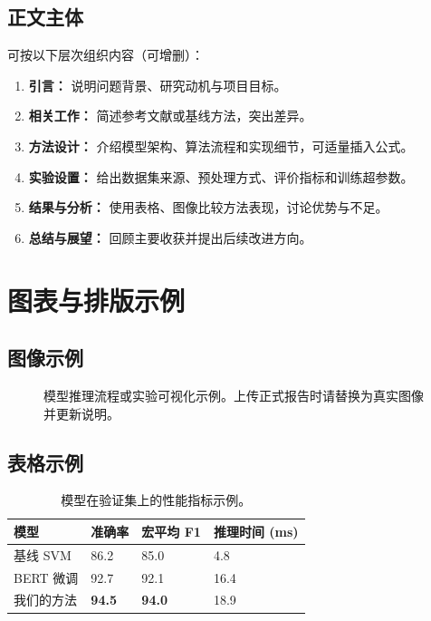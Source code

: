 \documentclass{applemlr}
\begin{document}
\subsection{正文主体}
可按以下层次组织内容（可增删）：
\begin{enumerate}
  \item \textbf{引言：} 说明问题背景、研究动机与项目目标。
  \item \textbf{相关工作：} 简述参考文献或基线方法，突出差异。
  \item \textbf{方法设计：} 介绍模型架构、算法流程和实现细节，可适量插入公式。
  \item \textbf{实验设置：} 给出数据集来源、预处理方式、评价指标和训练超参数。
  \item \textbf{结果与分析：} 使用表格、图像比较方法表现，讨论优势与不足。
  \item \textbf{总结与展望：} 回顾主要收获并提出后续改进方向。
\end{enumerate}

\section{图表与排版示例}
\label{sec:figures}

\subsection{图像示例}
\begin{figure}[ht]
  \centering
  \caption{模型推理流程或实验可视化示例。上传正式报告时请替换为真实图像并更新说明。}
  \label{fig:placeholder}
\end{figure}

\subsection{表格示例}
\begin{table}[ht]
  \centering
  \caption{模型在验证集上的性能指标示例。}
  \label{tab:metrics}
  \begin{tabularx}{0.9\linewidth}{@{}l *{3}{Y}@{}}
    \toprule
    \textbf{模型} & \textbf{准确率} & \textbf{宏平均 F1} & \textbf{推理时间 (ms)} \\
    \midrule
    基线 SVM & 86.2 & 85.0 & 4.8 \\
    BERT 微调 & 92.7 & 92.1 & 16.4 \\
    我们的方法 & \textbf{94.5} & \textbf{94.0} & 18.9 \\
    \bottomrule
  \end{tabularx}
\end{table}
\end{document}
